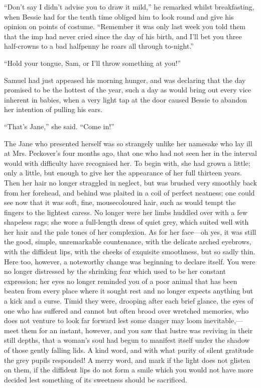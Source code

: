 ``Don't say I didn't advise you to draw it mild,'' he remarked whilst
breakfasting, when Bessie had for the tenth time obliged him to look
round and give his opinion on points of costume. ``Remember it was only
last week you told them that the imp had never cried since the day of
his birth, and I'll bet you three half-crowns to a bad halfpenny he
roars all through to-night.''

{\protect\hypertarget{236}{}{}}``Hold your tongue, Sam, or I'll throw
something at you!''

Samuel had just appeased his morning hunger, and was declaring that the
day promised to be the hottest of the year, such a day as would bring
out every vice inherent in babies, when a very light tap at the door
caused Bessie to abandon her intention of pulling his ears.

``That's Jane,'' she said. ``Come in!''

The Jane who presented herself was so strangely unlike her namesake who
lay ill at Mrs. Peckover's four months ago, that one who had not seen
her in the interval would with difficulty have recognised her. To begin
with, she had grown a little; only a little, but enough to give her the
appearance of her full thirteen years. Then her hair no longer straggled
in neglect, but was brushed very smoothly back from her forehead, and
behind was plaited in a coil of perfect neatness; one could see now that
it was soft, fine, mousecoloured hair, such as would tempt the fingers
to the lightest caress. No longer were her
{\protect\hypertarget{237}{}{}}limbs huddled over with a few shapeless
rags; she wore a full-length dress of quiet grey, which suited well with
her hair and the pale tones of her complexion. As for her face---oh yes,
it was still the good, simple, unremarkable countenance, with the
delicate arched eyebrows, with the diffident lips, with the cheeks of
exquisite smoothness, but so sadly thin. Here too, however, a noteworthy
change was beginning to declare itself. You were no longer distressed by
the shrinking fear which used to be her constant expression; her eyes no
longer reminded you of a poor animal that has been beaten from every
place where it sought rest and no longer expects anything but a kick and
a curse. Timid they were, drooping after each brief glance, the eyes of
one who has suffered and cannot but often brood over wretched memories,
who does not venture to look far forward lest some danger may loom
inevitable,---meet them for an instant, however, and you saw that lustre
was reviving in their still depths, that a woman's soul had begun to
manifest itself {\protect\hypertarget{238}{}{}}under the shadow of those
gently falling lids. A kind word, and with what purity of silent
gratitude the grey pupils responded! A merry word, and mark if the light
does not glisten on them, if the diffident lips do not form a smile
which you would not have more decided lest something of its sweetness
should be sacrificed.

